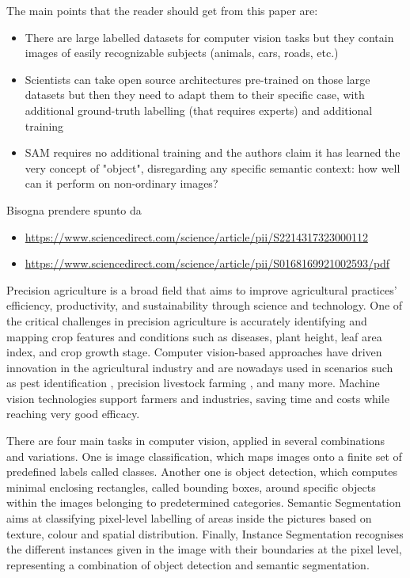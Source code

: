 \documentclass[runningheads]{llncs}
\begin{document}
{
\color{red} The main points that the reader should get from this paper are:
\begin{itemize}
\item There are large labelled datasets for computer vision tasks but they contain images of easily recognizable subjects (animals, cars, roads, etc.)
\item Scientists can take open source architectures pre-trained on those large datasets but then they need to adapt them to their specific case, with additional ground-truth labelling (that requires experts) and additional training
\item SAM requires no additional training and the authors claim it has learned the very concept of "object", disregarding any specific semantic context: how well can it perform on non-ordinary images?
\end{itemize}
Bisogna prendere spunto da 
\begin{itemize}
\item \url{https://www.sciencedirect.com/science/article/pii/S2214317323000112}
\item \url{https://www.sciencedirect.com/science/article/pii/S0168169921002593/pdf}
\end{itemize}
}

Precision agriculture is a broad field that aims to improve agricultural practices' efficiency, productivity, and sustainability through science and technology. One of the critical challenges in precision agriculture is accurately identifying and mapping crop features and conditions such as diseases, plant height, leaf area index, and crop growth stage. Computer vision-based approaches have driven innovation in the agricultural industry and are nowadays used in scenarios such as pest identification \cite{yuan_advanced_2022}, precision livestock farming \cite{QIAO2019104958}, and many more.  Machine vision technologies support farmers and industries, saving time and costs while reaching very good efficacy. 

There are four main tasks in computer vision, applied in several combinations and variations. One is image classification, which maps images onto a finite set of predefined labels called classes. Another one is object detection, which computes minimal enclosing rectangles, called bounding boxes, around specific objects within the images belonging to predetermined categories. Semantic Segmentation aims at classifying pixel-level labelling of areas inside the pictures based on texture, colour and spatial distribution. Finally, Instance Segmentation recognises the different instances given in the image with their boundaries at the pixel level, representing a combination of object detection and semantic segmentation.
\end{document}
